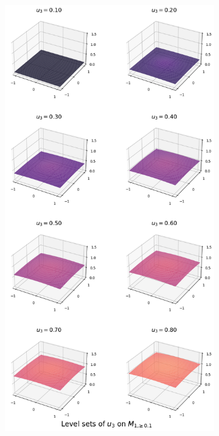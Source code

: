 \documentclass[titlepage,numbers=noenddot,oneside,%
cleardoublepage=empty,paper=a4,fontsize=11pt,%
english,%
]{scrartcl}
\begin{document}
\begin{figure}


    \centering
    \begin{subfigure}{.49\textwidth}
        \includegraphics[width=\textwidth]{figures/level_sets_u3_modified_with_a_0.1.png}

\end{subfigure}
\end{figure}
\end{document}
